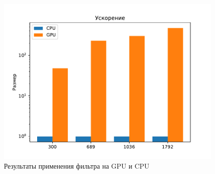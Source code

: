 \begin{landscape}
\begin{figure}
    \thispagestyle{empty} 
    \centering
    \includegraphics[height=0.8\textwidth]{figures/bar.pdf}
    \caption{Результаты применения фильтра на GPU и CPU\\}
    \label{fig:bar}
\end{figure}
\end{landscape}